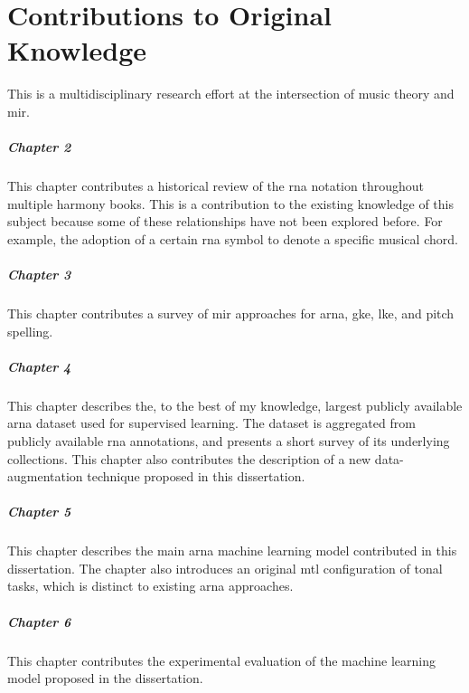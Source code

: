 \chapter*{Contributions to Original Knowledge}
\label{chap:contributionstoknowledge}

This \thesisdiss{} is a multidisciplinary research effort at
the intersection of music theory and \gls{mir}.

\paragraph{Chapter 2}

This chapter contributes a historical review of the
\gls{rna} notation throughout multiple harmony books. This
is a contribution to the existing knowledge of this subject
because some of these relationships have not been explored
before. For example, the adoption of a certain \gls{rna}
symbol to denote a specific musical chord.

\paragraph{Chapter 3}

This chapter contributes a survey of \gls{mir} approaches
for \gls{arna}, \gls{gke}, \gls{lke}, and pitch spelling. 

\paragraph{Chapter 4}

This chapter describes the, to the best of my knowledge,
largest publicly available \gls{arna} dataset used for
supervised learning. The dataset is aggregated from publicly
available \gls{rna} annotations, and presents a short survey
of its underlying collections. This chapter also contributes
the description of a new data-augmentation technique
proposed in this dissertation.

\paragraph{Chapter 5}

This chapter describes the main \gls{arna} machine learning
model contributed in this dissertation. The chapter also
introduces an original \gls{mtl} configuration of tonal
tasks, which is distinct to existing \gls{arna} approaches.

\paragraph{Chapter 6}

This chapter contributes the experimental evaluation of the
machine learning model proposed in the dissertation. 
